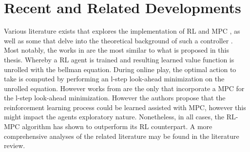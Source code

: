 \section{Recent and Related Developments}
Various literature exists that explores the implementation of RL and MPC ,\cite{arroyoReinforcedModelPredictive2022,beckenbachAddressingInfinitehorizonOptimization2018,lubarsCombiningReinforcementLearning2021,lubbersAutonomousGreenhouseClimate2023,sikchiLearningOffPolicyOnline2021,} as well as some that delve into the theoretical background of such a controller \cite{beckenbachAddressingInfinitehorizonOptimization2018,bertsekasLessonsAlphaZeroOptimal,bertsekasNewtonMethodReinforcement2022,linReinforcementLearningBasedModel2023}.
Most notably, the works in \cite{sikchiLearningOffPolicyOnline2021,arroyoReinforcedModelPredictive2022,linReinforcementLearningBasedModel2023,bertsekasLessonsAlphaZeroOptimal} are the most similar to what is proposed in this thesis. Whereby a RL agent is trained and resulting learned value function is unrolled with the bellman equation. During online play, the optimal action to take is computed by performing an l-step look-ahead minimization on the unrolled equation. However works from \cite{arroyoReinforcedModelPredictive2022,linReinforcementLearningBasedModel2023,beckenbachAddressingInfinitehorizonOptimization2018} are the only that incorporate a MPC for the l-step look-ahead minimization. However the authors propose that the reinforcement learning process could be learned assisted with MPC, however this might impact the agents exploratory nature. Nonetheless, in all cases, the RL-MPC algorithm has shown to outperform its RL counterpart. A more comprehensive analyses of the related literature may be found in the literature review.




